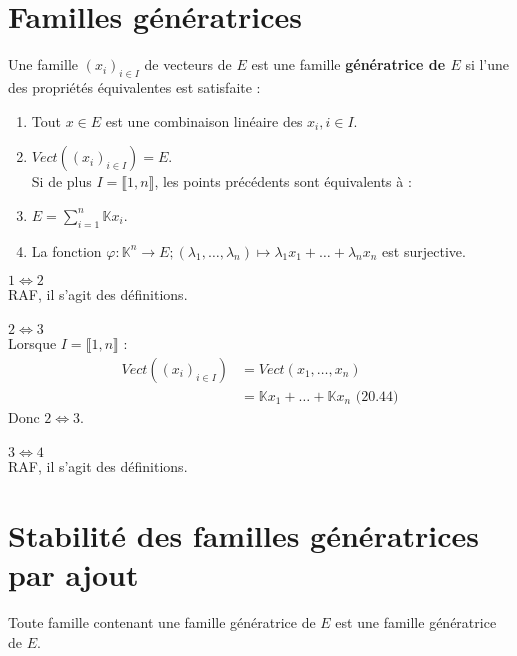 \documentclass[../main.tex]{subfiles}
\begin{document}
\section{Familles génératrices}
\begin{tcolorbox}[title=Propostion 20.66, title filled=false, colframe=lightblue, colback=lightblue!10!white]
    Une famille $(x_i)_{i\in I}$ de vecteurs de $E$ est une famille \textbf{génératrice de $E$} si l'une des propriétés équivalentes est satisfaite : 
    \begin{enumerate}
        \item Tout $x\in E$ est une combinaison linéaire des $x_i, i\in I$. 
        \item $Vect((x_i)_{i\in I}) = E$. \\
        Si de plus $I = \llbracket 1, n \rrbracket$, les points précédents sont équivalents à : 
        \item $E = \sum\limits_{i=1}^{n} \mathbb{K} x_i$. 
        \item La fonction $\varphi: \mathbb{K}^n \to E; (\lambda_1, \ldots, \lambda_n) \mapsto \lambda_1 x_1 + \ldots + \lambda_n x_n$ est surjective.
    \end{enumerate}
\end{tcolorbox}

$\boxed{1 \Leftrightarrow 2}$ \\
RAF, il s'agit des définitions. \\ \\

$\boxed{2 \Leftrightarrow 3}$ \\
Lorsque $I = \llbracket 1, n \rrbracket$ : 
\begin{align*}
    Vect((x_i)_{i\in I}) &= Vect(x_1, \ldots, x_n) \\
    &= \mathbb{K} x_1 + \ldots + \mathbb{K} x_n \text{ (20.44)}
\end{align*}
Donc $2 \Leftrightarrow 3$. \\ \\

$\boxed{3 \Leftrightarrow 4}$ \\
RAF, il s'agit des définitions.

\section{Stabilité des familles génératrices par ajout}
\begin{tcolorbox}[title=Propostion 20.68, title filled=false, colframe=lightblue, colback=lightblue!10!white]
    Toute famille contenant une famille génératrice de $E$ est une famille génératrice de $E$.
\end{tcolorbox}
\end{document}
